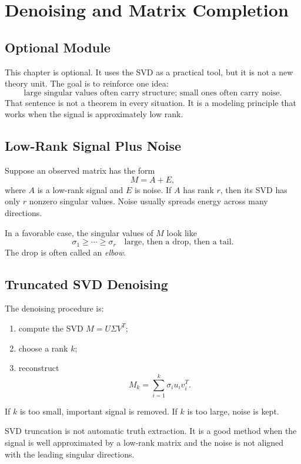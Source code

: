 \chapter{Denoising and Matrix Completion}
\label{ch:denoising-matrix-completion}

\section{Optional Module}

This chapter is optional. It uses the SVD as a practical tool, but it is not a
new theory unit. The goal is to reinforce one idea:
\[
  \text{large singular values often carry structure; small ones often carry noise.}
\]
That sentence is not a theorem in every situation. It is a modeling principle
that works when the signal is approximately low rank.

\section{Low-Rank Signal Plus Noise}

Suppose an observed matrix has the form
\[
  M=A+E,
\]
where $A$ is a low-rank signal and $E$ is noise. If $A$ has rank $r$, then its
SVD has only $r$ nonzero singular values. Noise usually spreads energy across
many directions.

In a favorable case, the singular values of $M$ look like
\[
  \sigma_1\geq\cdots\geq\sigma_r
  \quad\text{large, then a drop, then a tail.}
\]
The drop is often called an \emph{elbow}.

\section{Truncated SVD Denoising}

The denoising procedure is:
\begin{enumerate}
  \item compute the SVD $M=U\Sigma V^T$;
  \item choose a rank $k$;
  \item reconstruct
        \[
          M_k=\sum_{i=1}^k \sigma_i u_i v_i^T.
        \]
\end{enumerate}

If $k$ is too small, important signal is removed. If $k$ is too large, noise is
kept.

\begin{warningbox}
SVD truncation is not automatic truth extraction. It is a good method when the
signal is well approximated by a low-rank matrix and the noise is not aligned
with the leading singular directions.
\end{warningbox}

